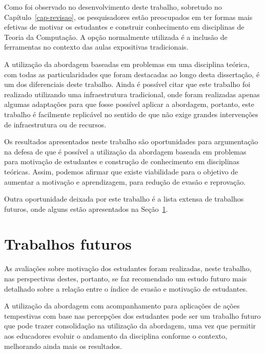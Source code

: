 \label{sec-conclusao}
\acresetall
Como foi observado no desenvolvimento deste trabalho, sobretudo
no Capítulo~\ref{cap-revisao}, 
os pesquisadores estão preocupados em ter formas mais
efetivas de motivar os estudantes e construir conhecimento
em disciplinas de Teoria da Computação.
A opção normalmente utilizada é a inclusão de ferramentas
no contexto das aulas expositivas tradicionais.

A utilização da abordagem baseadas em problemas
em uma disciplina teórica, com todas as
particularidades que foram destacadas ao longo desta
dissertação, é um dos diferenciais deste trabalho.
Ainda é possível citar que este trabalho foi realizado
utilizando uma infraestrutura tradicional, onde foram
realizadas apenas algumas adaptações para que fosse
possível aplicar a abordagem, portanto, este
trabalho é facilmente replicável no sentido de que não exige
grandes intervenções de infraestrutura ou de recursos.

Os resultados apresentados neste trabalho são oportunidades
para argumentação na defesa de que é possível a utilização
da abordagem baseada em problemas para motivação de
estudantes e construção de conhecimento em disciplinas
teóricas.
Assim, podemos afirmar que existe viabilidade para
o objetivo de aumentar a motivação e aprendizagem, para redução
de evasão e reprovação.

Outra oportunidade deixada por este trabalho é
a lista extensa de trabalhos futuros, onde alguns estão
apresentados na Seção~\ref{sec-trab-futuros}.

\section{Trabalhos futuros}
\label{sec-trab-futuros}
As avaliações sobre motivação dos estudantes
foram realizadas, neste trabalho, nas perspectivas
destes, portanto, se faz recomendado um estudo futuro
mais detalhado sobre a relação entre o índice
de evasão e motivação de estudantes.

A utilização da abordagem com acompanhamento
para aplicações de ações tempestivas com base nas
percepções dos estudantes pode ser um trabalho futuro
que pode trazer consolidação na utilização da
abordagem, uma vez que permitir aos educadores evoluir
o andamento da disciplina conforme o contexto,
melhorando ainda mais os resultados.

